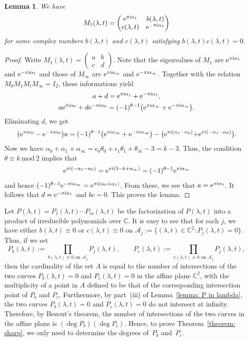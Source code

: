 \documentclass[10pt,a4paper]{amsart}
\numberwithin{equation}{section}
\newtheorem{Lemma}[Theorem]{Lemma}
\def\C{\mathbb C}
\def\mod{\ \mathrm{mod}\ }
\def\M#1#2#3#4{\begin{pmatrix}#1&#2\\#3&#4\end{pmatrix}}
\def\SM#1#2#3#4{\left(\begin{smallmatrix}#1&#2\\#3&#4\end{smallmatrix}
 \right)}
\begin{document}
\begin{Lemma} We have
\[
M_1(\lambda,t)=\M{{\rm e}^{\pi {\rm i}\alpha_1}}{b(\lambda,t)}{c(\lambda,t)}
{{\rm e}^{-\pi {\rm i}\alpha_1}}
\]
for some complex numbers $b(\lambda,t)$ and $c(\lambda,t)$ satisfying
$b(\lambda,t)c(\lambda,t)=0$.
\end{Lemma}

\begin{proof} Write $M_1(\lambda,t)=\SM abcd$. Note that the
 eigenvalues of $M_1$ are ${\rm e}^{\pi {\rm i}\alpha_1}$ and ${\rm e}^{-\pi
 {\rm i}\alpha_1}$ and those of $M_\infty$ are ${\rm e}^{\pi {\rm i}\alpha_\infty}$
 and ${\rm e}^{-\pi {\rm i}\alpha_\infty}$. Together with the relation
 $M_0M_1M_tM_\infty=I_2$, these informations yield
 \begin{gather*}
 a+d={\rm e}^{\pi {\rm i}\alpha_1}+{\rm e}^{-\pi {\rm i}\alpha_1}, \\
 a{\rm e}^{\pi {\rm i}\alpha_0}+d{\rm e}^{-\pi {\rm i}\alpha_0}
 =(-1)^{\theta-1}\bigl({\rm e}^{\pi {\rm i}\alpha_\infty}+{\rm e}^{-\pi {\rm i}\alpha_\infty}\bigr).
 \end{gather*}
 Eliminating $d$, we get
\[
 \bigl({\rm e}^{\pi {\rm i}\alpha_0}-{\rm e}^{-\pi {\rm i}\alpha_0}\bigr)a
 =(-1)^{\theta-1}\bigl({\rm e}^{\pi {\rm i}\alpha_\infty}+{\rm e}^{-\pi {\rm i}\alpha_\infty}\bigr)
 -\bigl({\rm e}^{\pi {\rm i}(\alpha_1-\alpha_0)}{+{\rm e}^{\pi {\rm i}(-\alpha_1-\alpha_0)}}\bigr).
\]
 Now we have $\alpha_0+\alpha_1+\alpha_\infty=\epsilon_0\theta_0
 +\epsilon_1\theta_1+\theta_\infty-3=k-3$. Thus, the condition
 $\theta\equiv k\mod 2$ implies that
\[
 {\rm e}^{\pi {\rm i}(-\alpha_1-\alpha_0)}={\rm e}^{\pi {\rm i}(3-k+\alpha_\infty)}
 =(-1)^{\theta-1}{\rm e}^{\pi {\rm i}\alpha_\infty}
\]
 and hence $(-1)^{\theta-1}{\rm e}^{-\pi {\rm i}\alpha_\infty}
 ={\rm e}^{\pi {\rm i}(\alpha_0+\alpha_1)}$.
 From these, we see that $a={\rm e}^{\pi {\rm i}\alpha_1}$. It follows that
 $d={\rm e}^{-\pi {\rm i}\alpha_1}$ and $bc=0$. This proves the lemma.
\end{proof}

Let $P(\lambda,t)=P_1(\lambda,t)\cdots P_m(\lambda,t)$ be
the factorization of $P(\lambda,t)$ into a product of irreducible
polynomials over $\C$. It is easy to see that for each $j$, we have
either $b(\lambda,t)\equiv 0$ or $c(\lambda,t)\equiv 0$ on $\mathcal
A_j:=\bigl\{(\lambda,t)\in\C^2\colon P_j(\lambda,t)=0\bigr\}$. Thus, if we set
\[
 P_b(\lambda,t):=\prod_{b(\lambda,t)\equiv 0\text{ on }\mathcal A_j}
 P_j(\lambda,t), \qquad
 P_c(\lambda,t):=\prod_{c(\lambda,t)\equiv 0\text{ on }\mathcal A_j}
 P_j(\lambda,t),
\]
then the cardinality of the set $A$ is equal to the number of
intersections of the two curves $P_b(\lambda,t)=0$ and
$P_c(\lambda,t)=0$ in the affine plane $\C^2$, with the multiplicity
of a point in $A$ defined to be that of the corresponding intersection
point of $P_b$ and $P_c$. Furthermore, by part~(iii) of Lemma~\ref{lemma: P in lambda}, the two curves $P_b(\lambda,t)=0$ and
$P_c(\lambda,t)=0$ do not intersect at infinity. Therefore, by
Bezout's theorem, the number of intersections of the two curves in the
affine plane is $(\deg P_b)(\deg P_c)$. Hence, to prove Theorem~\ref{theorem: sharp}, we only need to determine the degrees of~$P_b$
and~$P_c$.
\end{document}
